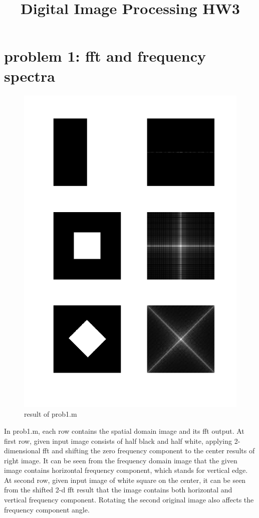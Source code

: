 \documentclass[extendedabs]{bmvc2k}
\begin{document}
\title{Digital Image Processing HW3}

\maketitle
\vspace{-0.2in}

\section*{problem 1: fft and frequency spectra}

\begin{figure}[h]
    \centering
    \includegraphics[width=0.7\linewidth]{hw3_1_1}
    \caption{result of prob1.m}
    \label{fig:1}
\end{figure}

In prob1.m, each row contains the spatial domain image and its fft output.
At first row, given input image consists of half black and half white, 
applying 2-dimensional fft and shifting the zero frequency component to the center
results of right image. It can be seen from the frequency domain image that the given
image contains horizontal frequency component, which stands for vertical edge.
At second row, given input image of white square on the center, it can be seen from
the shifted 2-d fft result that the image contains both horizontal and vertical frequency
component. Rotating the second original image also affects the frequency component angle.
\end{document}
